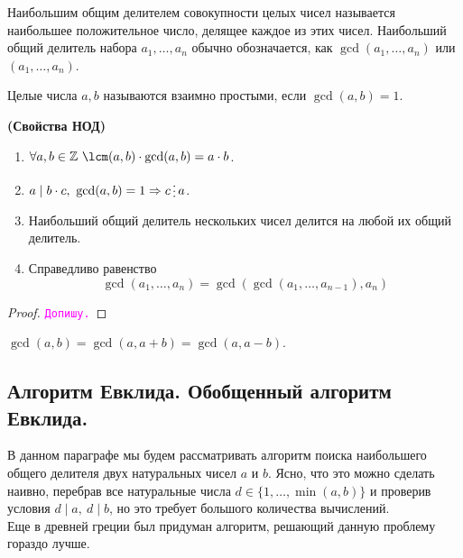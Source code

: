\documentclass[11pt]{article}
\begin{document}
\begin{definition}

	Наибольшим общим делителем совокупности целых чисел называется наибольшее положительное число, делящее каждое из этих чисел.
	Наибольший общий делитель набора $a_1, \ldots, a_n$ обычно обозначается, как $\gcd(a_1, \ldots, a_n)$ или $(a_1, \ldots, a_n)$.

\end{definition}

\begin{definition}
	Целые числа $a, b$ называются взаимно простыми, если $\gcd(a, b) = 1$.
\end{definition}

\begin{theorem} \textbf{(Свойства НОД)}
	\begin{enumerate}
	    \item $\forall a, b \in \mathbb{Z}\ \lcm(a, b) \cdot \gcd(a, b) = a \cdot b$.

		\item $a \mid b \cdot c, \ \gcd(a, b) = 1 \Rightarrow c \divisible a$.

		\item Наибольший общий делитель нескольких чисел делится на любой их общий делитель.

		\item Справедливо равенство
			  \[ \gcd(a_1, \ldots, a_n) = \gcd(\gcd(a_1, \ldots, a_{n - 1}), a_n)\]
	\end{enumerate}
\end{theorem}

\begin{proof}

    \textcolor{magenta}{\texttt{Допишу.}}

\end{proof}

\begin{statement}

	$\gcd(a, b) = \gcd(a, a + b) = \gcd(a, a - b)$.

\end{statement}

\subsection{Алгоритм Евклида. Обобщенный алгоритм Евклида.}

	В данном параграфе мы будем рассматривать алгоритм поиска наибольшего общего делителя двух натуральных чисел $a$ и $b$.
	Ясно, что это можно сделать наивно, перебрав все натуральные числа $d \in \{ 1, \ldots, \min(a, b) \}$ и проверив условия $d \mid a, \ d \mid b$, но
	это требует большого количества вычислений.\\
	Еще в древней греции был придуман алгоритм, решающий данную проблему гораздо лучше.
\end{document}
